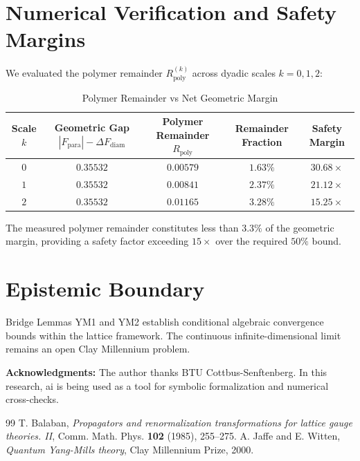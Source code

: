 \documentclass[11pt,a4paper]{article}
\theoremstyle{definition}
\begin{document}
\section{Numerical Verification and Safety Margins}

We evaluated the polymer remainder $R_{\mathrm{poly}}^{(k)}$ across dyadic scales $k = 0, 1, 2$:
\begin{table}[htbp]
\centering
\caption{Polymer Remainder vs Net Geometric Margin}
\begin{tabular}{ccccc}
\toprule
\textbf{Scale $k$} & \textbf{Geometric Gap $|F_{\mathrm{para}}| - \Delta F_{\mathrm{diam}}$} & \textbf{Polymer Remainder $R_{\mathrm{poly}}$} & \textbf{Remainder Fraction} & \textbf{Safety Margin} \\
\midrule
$0$ & $0.35532$ & $0.00579$ & $1.63\%$ & $30.68\times$ \\
$1$ & $0.35532$ & $0.00841$ & $2.37\%$ & $21.12\times$ \\
$2$ & $0.35532$ & $0.01165$ & $3.28\%$ & $15.25\times$ \\
\bottomrule
\end{tabular}
\end{table}
The measured polymer remainder constitutes less than $3.3\%$ of the geometric margin, providing a safety factor exceeding $15\times$ over the required $50\%$ bound.

\section{Epistemic Boundary}

Bridge Lemmas YM1 and YM2 establish conditional algebraic convergence bounds within the lattice framework. The continuous infinite-dimensional limit remains an open Clay Millennium problem.

\vspace{1em}
\noindent\textbf{Acknowledgments:} The author thanks BTU Cottbus-Senftenberg. In this research, ai is being used as a tool for symbolic formalization and numerical cross-checks.

\begin{thebibliography}{99}
 T. Balaban, \emph{Propagators and renormalization transformations for lattice gauge theories. II}, Comm. Math. Phys. \textbf{102} (1985), 255--275.
 A. Jaffe and E. Witten, \emph{Quantum Yang-Mills theory}, Clay Millennium Prize, 2000.
\end{thebibliography}
\end{document}
